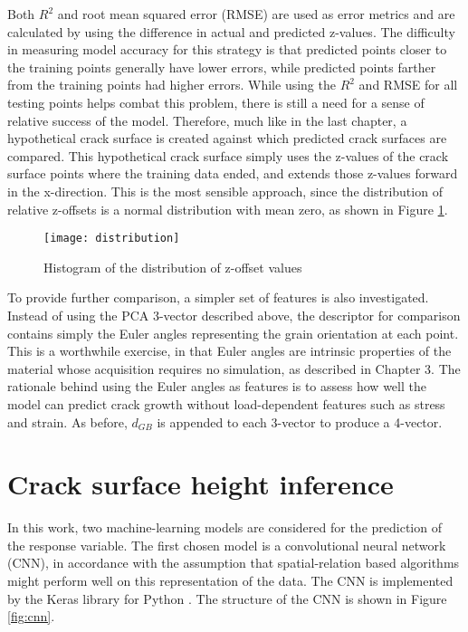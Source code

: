 Both $R^2$ and root mean squared error (RMSE) are used as error metrics and are calculated by using the difference in actual and predicted z-values.  The difficulty in measuring model accuracy for this strategy is that predicted points closer to the training points generally have lower errors, while predicted points farther from the training points had higher errors.  While using the $R^2$ and RMSE for all testing points helps combat this problem, there is still a need for a sense of relative success of the model.  Therefore, much like in the last chapter, a hypothetical crack surface is created against which predicted crack surfaces are compared.  This hypothetical crack surface simply uses the z-values of the crack surface points where the training data ended, and extends those z-values forward in the x-direction.  This is the most sensible approach, since the distribution of relative z-offsets is a normal distribution with mean zero, as shown in Figure \ref{fig:distribution}.

\begin{figure}[b]
  \centering
    \texttt{[image: distribution]}
    \caption{Histogram of the distribution of z-offset values}
  \label{fig:distribution}
\end{figure}

To provide further comparison, a simpler set of features is also investigated.  Instead of using the PCA 3-vector described above, the descriptor for comparison contains simply the Euler angles representing the grain orientation at each point.  This is a worthwhile exercise, in that Euler angles are intrinsic properties of the material whose acquisition requires no simulation, as described in Chapter 3.  The rationale behind using the Euler angles as features is to assess how well the model can predict crack growth without load-dependent features such as stress and strain.  As before, $d_{GB}$ is appended to each 3-vector to produce a 4-vector.

\section{Crack surface height inference}
In this work, two machine-learning models are considered for the prediction of the response variable.  The first chosen model is a convolutional neural network (CNN), in accordance with the assumption that spatial-relation based algorithms might perform well on this representation of the data.  The CNN is implemented by the Keras library for Python \cite{keras}.  The structure of the CNN is shown in Figure \ref{fig:cnn}.


